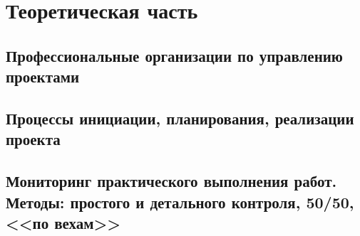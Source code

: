 \section{Теоретическая часть}
\subsection{Профессиональные организации по управлению проектами}





\subsection{Процессы инициации, планирования, реализации проекта}

\subsection{Мониторинг практического выполнения работ. Методы: простого и детального контроля, 50/50, <<по вехам>>}
